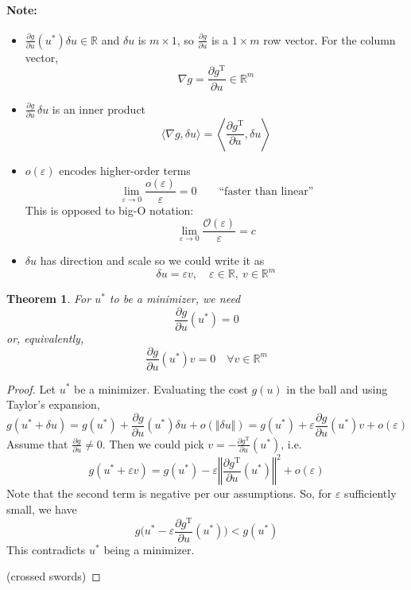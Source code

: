 \documentclass[letterpaper,12pt,titlepage]{report}
\newcommand{\trans}{^\text{T}}
\newcommand*\pder[2]{\frac{\partial #1}{\partial #2}}
\theoremstyle{plain}
\newtheorem*{thm}{Theorem}
\theoremstyle{definition}
\begin{document}
\paragraph{Note:} \mbox{}
\begin{itemize}
\item $\displaystyle \pder{g}{u}(u^*) \delta u \in \mathbb R$ and $\delta u$ is $m\times 1$, so $\displaystyle \pder{g}{u}$ is a $1\times m$ row vector. For the column vector,
  \[ \nabla g = \pder{g\trans}{u} \in \mathbb R^m \]
\item $\displaystyle \pder{g}{u} \, \delta u$ is an inner product
  \[ \langle \nabla g, \delta u \rangle = \left\langle \pder{g\trans}{u}, \delta u \right\rangle \]
\item $o(\varepsilon)$ encodes higher-order terms
  \[ \lim_{\varepsilon\to 0} \frac{o(\varepsilon)}{\varepsilon} = 0 \qquad \text{``faster than linear''} \]
  This is opposed to big-O notation:
  \[ \lim_{\varepsilon\to 0} \frac{\mathcal O(\varepsilon)}{\varepsilon} = c \]
\item $\delta u$ has direction and scale so we could write it as
  \[ \delta u = \varepsilon v, \quad \varepsilon\in\mathbb R,\ v\in\mathbb R^m \]
\end{itemize}

\begin{thm}
  For $u^*$ to be a minimizer, we need
  \[ \pder{g}{u} (u^*) = 0 \]
  or, equivalently,
  \[ \pder{g}{u} (u^*) v = 0 \quad \forall v\in\mathbb R^m \]
\end{thm}

\begin{proof}
  Let $u^*$ be a minimizer. Evaluating the cost $g(u)$ in the ball and using Taylor's expansion,
  \[ g(u^* + \delta u) = g(u^*) + \pder{g}{u} (u^*) \delta u + o(\Vert\delta u\Vert) = g(u^*) + \varepsilon \pder{g}{u} (u^*) v + o(\varepsilon) \]
  Assume that $\pder{g}{u} \neq 0$. Then we could pick $v=-\pder{g\trans}{u}(u^*)$, i.e.
  \[ g(u^*+\varepsilon v) = g(u^*) - \varepsilon \left\Vert \pder{g\trans}{u} (u^*) \right\Vert^2 + o(\varepsilon) \]
  Note that the second term is negative per our assumptions. So, for $\varepsilon$ sufficiently small, we have
  \[ g \Big( u^* - \varepsilon\pder{g\trans}{u} (u^*) \Big) < g(u^*) \]
  This contradicts $u^*$ being a minimizer. \quad
  (crossed swords)
\end{proof}
\end{document}
